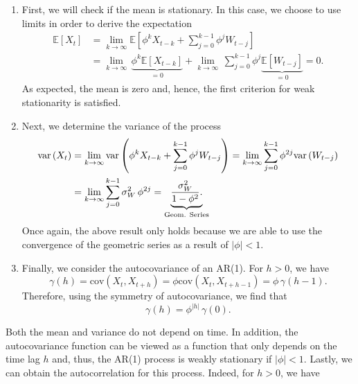 \documentclass[]{book}
\providecommand{\tightlist}{%
  \setlength{\itemsep}{0pt}\setlength{\parskip}{0pt}}
\theoremstyle{definition}
\theoremstyle{definition}
\theoremstyle{definition}
\theoremstyle{remark}
\begin{document}
\begin{enumerate}
\def\labelenumi{\arabic{enumi}.}
\tightlist
\item
  First, we will check if the mean is stationary. In this case, we
  choose to use limits in order to derive the expectation
  \[\begin{aligned}
   \mathbb{E}\left[ {{X_t}} \right] &= \mathop {\lim }\limits_{k \to \infty } \mathbb{E}\left[ {{\phi^k}{X_{t-k}} + \sum\limits_{j = 0}^{k - 1} {\phi^j{W_{t - j}}} } \right] \\
   &= \mathop {\lim }\limits_{k \to \infty } \, \underbrace {{\phi ^k}{\mathbb{E}[X_{t-k}]}}_{= 0} + \mathop {\lim }\limits_{k \to \infty } \, \sum\limits_{j = 0}^{k - 1} {\phi^j\underbrace {\mathbb{E}\left[ {{W_{t - j}}} \right]}_{ = 0}}
   = 0.
   \end{aligned} \] As expected, the mean is zero and, hence, the first
  criterion for weak stationarity is satisfied.
\item
  Next, we determine the variance of the process \[\begin{aligned}
   \text{var}\left( {{X_t}} \right) &= \mathop {\lim }\limits_{k \to \infty } \text{var}\left( {{\phi^k}{X_{t-k}} + \sum\limits_{j = 0}^{k - 1} {\phi^j{W_{t - j}}} } \right)
   = \mathop {\lim }\limits_{k \to \infty } \sum\limits_{j = 0}^{k - 1} {\phi ^{2j} \text{var}\left( {{W_{t - j}}} \right)}  \\
   &= \mathop {\lim }\limits_{k \to \infty } \sum\limits_{j = 0}^{k - 1} \sigma _W^2 \, {\phi ^{2j}}  =  
     \underbrace {\frac{\sigma _W^2}{{1 - {\phi ^2}}}.}_{\begin{subarray}{l} 
       {\text{Geom. Series}} 
       \end{subarray}}
   \end{aligned} \] Once again, the above result only holds because we
  are able to use the convergence of the geometric series as a result of
  \(\left| \phi \right| < 1\).
\item
  Finally, we consider the autocovariance of an AR(1). For \(h > 0\), we
  have
  \[\gamma \left( h \right) =  \text{cov}\left( {{X_t},{X_{t + h}}} \right) = \phi \text{cov}\left( {{X_t},{X_{t + h - 1}}} \right) = \phi \, \gamma \left( h-1 \right).\]
  Therefore, using the symmetry of autocovariance, we find that
  \[\gamma \left( h \right) = \phi^{|h|} \, \gamma(0).\]
\end{enumerate}

Both the mean and variance do not depend on time. In addition, the
autocovariance function can be viewed as a function that only depends on
the time lag \(h\) and, thus, the AR(1) process is weakly stationary if
\(\left| \phi \right| < 1\). Lastly, we can obtain the autocorrelation
for this process. Indeed, for \(h > 0\), we have
\end{document}
